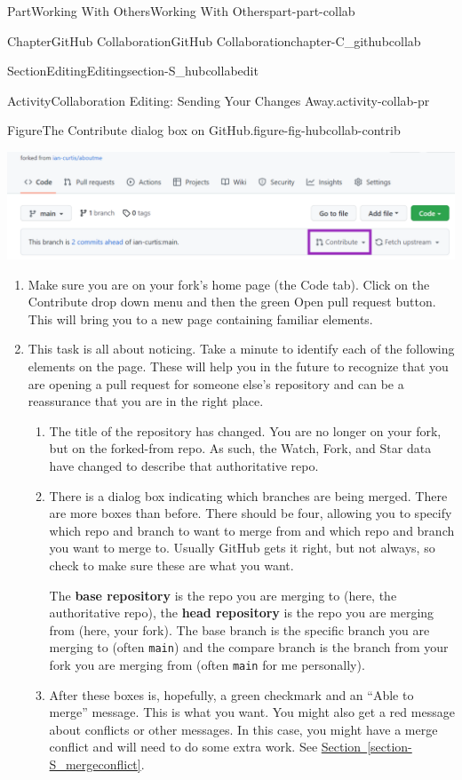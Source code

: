 \documentclass[oneside,10pt,]{book}
\newcommand{\xreffont}{\relax}
\newcommand{\mono}[1]{\texttt{#1}}
\newcommand{\terminology}[1]{\textbf{#1}}
\begin{document}
\begin{partptx}{Part}{Working With Others}{}{Working With Others}{}{}{part-part-collab}
\begin{chapterptx}{Chapter}{GitHub Collaboration}{}{GitHub Collaboration}{}{}{chapter-C_githubcollab}
\begin{sectionptx}{Section}{Editing}{}{Editing}{}{}{section-S_hubcollabedit}
\begin{activity}{Activity}{Collaboration Editing: Sending Your Changes Away.}{activity-collab-pr}
\begin{figureptx}{Figure}{The Contribute dialog box on GitHub.}{figure-fig-hubcollab-contrib}{}%
\begin{image}{0.025}{0.95}{0.025}{}%
\includegraphics[width=\linewidth]{external/hubcollab_contrib.pdf}
\end{image}%
\tcblower
\end{figureptx}%
\begin{enumerate}[font=\bfseries,label=(\alph*),ref=\alph*]%
\item{}Make sure you are on your fork's home page (the Code tab). Click on the Contribute drop down menu and then the green Open pull request button. This will bring you to a new page containing familiar elements.%
\item{}This task is all about noticing. Take a minute to identify each of the following elements on the page. These will help you in the future to recognize that you are opening a pull request for someone else's repository and can be a reassurance that you are in the right place.%
\begin{enumerate}
\item{}The title of the repository has changed. You are no longer on your fork, but on the forked-from repo. As such, the Watch, Fork, and Star data have changed to describe that authoritative repo.%
\item{}There is a dialog box indicating which branches are being merged. There are more boxes than before. There should be four, allowing you to specify which repo and branch to want to merge from and which repo and branch you want to merge to. Usually GitHub gets it right, but not always, so check to make sure these are what you want.%
\par
The \terminology{base repository} is the repo you are merging to (here, the authoritative repo), the \terminology{head repository} is the repo you are merging from (here, your fork). The base branch is the specific branch you are merging to (often \mono{main}) and the compare branch is the branch from your fork you are merging from (often \mono{main} for me personally).%
\item{}After these boxes is, hopefully, a green checkmark and an ``Able to merge'' message. This is what you want. You might also get a red message about conflicts or other messages. In this case, you might have a merge conflict and will need to do some extra work. See \hyperref[section-S_mergeconflict]{Section~{\xreffont\ref{section-S_mergeconflict}}}.%

\end{enumerate}
\end{enumerate}
\end{activity}
\end{sectionptx}
\end{chapterptx}
\end{partptx}
\end{document}
